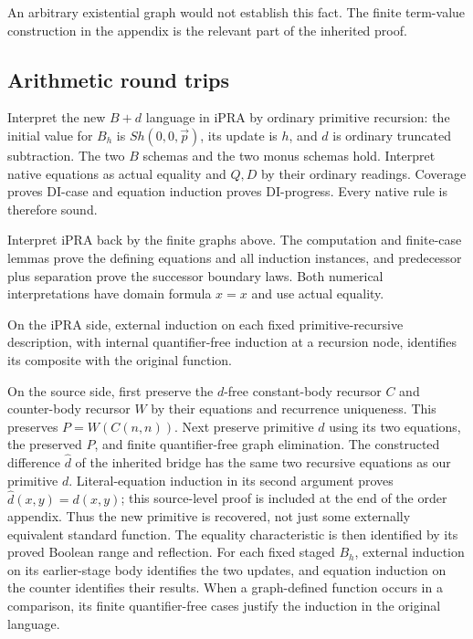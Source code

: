 An arbitrary existential graph would not establish this fact. The finite
term-value construction in the appendix is the relevant part of the
inherited proof.

\subsection{Arithmetic round trips}
Interpret the new $B+d$ language in iPRA by ordinary primitive recursion:
the initial value for $B_h$ is $S h(0,0,\vec p)$, its update is $h$, and
$d$ is ordinary truncated subtraction. The two $B$ schemas and the two
monus schemas hold. Interpret native equations as actual equality and
$Q,D$ by their ordinary readings. Coverage proves DI-case and equation
induction proves DI-progress. Every native rule is therefore sound.

Interpret iPRA back by the finite graphs above. The computation and
finite-case lemmas prove the defining equations and all induction
instances, and predecessor plus separation prove the successor boundary
laws. Both numerical interpretations have domain formula $x=x$ and use
actual equality.

On the iPRA side, external induction on each fixed primitive-recursive
description, with internal quantifier-free induction at a recursion
node, identifies its composite with the original function.

On the source side, first preserve the $d$-free constant-body recursor
$C$ and counter-body recursor $W$ by their equations and recurrence
uniqueness. This preserves $P=W(C(n,n))$. Next preserve primitive $d$
using its two equations, the preserved $P$, and finite quantifier-free
graph elimination. The constructed difference
$\widehat d$ of the inherited bridge has the same two recursive equations
as our primitive $d$. Literal-equation induction in its second argument
proves $\widehat d(x,y)=d(x,y)$; this source-level proof is included at the
end of the order appendix. Thus the new primitive is recovered, not just
some externally equivalent standard function. The equality characteristic
is then identified by its proved Boolean range and reflection. For each fixed staged
$B_h$, external induction on its earlier-stage body identifies the two
updates, and equation induction on the counter identifies their results.
When a graph-defined function occurs in a comparison, its finite
quantifier-free cases justify the induction in the original language.

